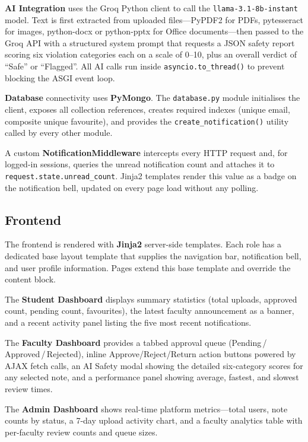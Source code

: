 \documentclass{sgcproject}
\begin{document}
\textbf{AI Integration} uses the Groq Python client to call the \texttt{llama-3.1-8b-instant} model. Text is first extracted from uploaded files---PyPDF2 for PDFs, pytesseract for images, python-docx or python-pptx for Office documents---then passed to the Groq API with a structured system prompt that requests a JSON safety report scoring six violation categories each on a scale of 0--10, plus an overall verdict of ``Safe'' or ``Flagged''. All AI calls run inside \texttt{asyncio.to\_thread()} to prevent blocking the ASGI event loop.

\textbf{Database} connectivity uses \textbf{PyMongo}. The \texttt{database.py} module initialises the client, exposes all collection references, creates required indexes (unique email, composite unique favourite), and provides the \texttt{create\_notification()} utility called by every other module.

A custom \textbf{NotificationMiddleware} intercepts every HTTP request and, for logged-in sessions, queries the unread notification count and attaches it to \texttt{request.state.unread\_count}. Jinja2 templates render this value as a badge on the notification bell, updated on every page load without any polling.

\subsection{Frontend}

The frontend is rendered with \textbf{Jinja2} server-side templates. Each role has a dedicated base layout template that supplies the navigation bar, notification bell, and user profile information. Pages extend this base template and override the content block.

The \textbf{Student Dashboard} displays summary statistics (total uploads, approved count, pending count, favourites), the latest faculty announcement as a banner, and a recent activity panel listing the five most recent notifications.

The \textbf{Faculty Dashboard} provides a tabbed approval queue (Pending\,/\,Approved\,/\,Rejected), inline Approve/Reject/Return action buttons powered by AJAX fetch calls, an AI Safety modal showing the detailed six-category scores for any selected note, and a performance panel showing average, fastest, and slowest review times.

The \textbf{Admin Dashboard} shows real-time platform metrics---total users, note counts by status, a 7-day upload activity chart, and a faculty analytics table with per-faculty review counts and queue sizes.
\end{document}
